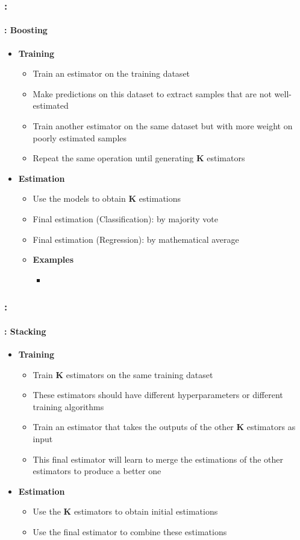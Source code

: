 \documentclass[xcolor=table]{beamer}
\begin{document}
\begin{frame}
	\frametitle{\insertshortsubtitle: \insertsection}
	\framesubtitle{\insertsubsection: Boosting}
	
	\begin{itemize}
		\item \textbf{Training}
		\begin{itemize}
			\item Train an estimator on the training dataset
			\item Make predictions on this dataset to extract samples that are not well-estimated
			\item Train another estimator on the same dataset but with more weight on poorly estimated samples
			\item Repeat the same operation until generating \textbf{K} estimators
		\end{itemize}
		\item \textbf{Estimation}
		\begin{itemize}
			\item Use the models to obtain \textbf{K} estimations
			\item Final estimation (Classification): by majority vote
			\item Final estimation (Regression): by mathematical average
			\item \textbf{Examples}
			\begin{itemize}
				\item {}
			\end{itemize}
		\end{itemize}
	\end{itemize}
	
\end{frame}


\begin{frame}
	\frametitle{\insertshortsubtitle: \insertsection}
	\framesubtitle{\insertsubsection: Stacking}
	
	\begin{itemize}
		\item \textbf{Training}
		\begin{itemize}
			\item Train \textbf{K} estimators on the same training dataset
			\item These estimators should have different hyperparameters or different training algorithms
			\item Train an estimator that takes the outputs of the other \textbf{K} estimators as input
			\item This final estimator will learn to merge the estimations of the other estimators to produce a better one
		\end{itemize}
		\item \textbf{Estimation}
		\begin{itemize}
			\item Use the \textbf{K} estimators to obtain initial estimations
			\item Use the final estimator to combine these estimations
		\end{itemize}
	\end{itemize}
	
\end{frame}
\end{document}
